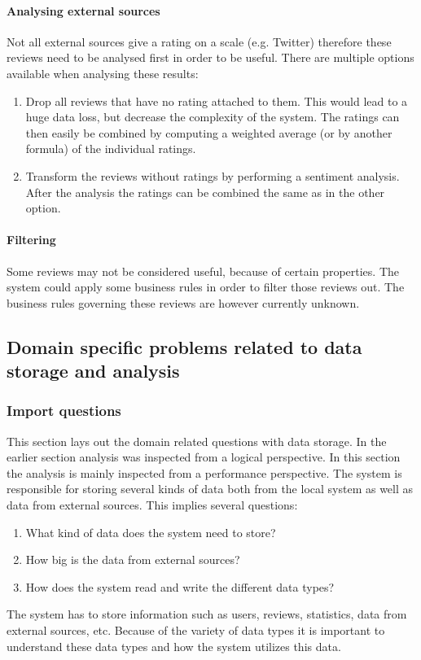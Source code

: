\paragraph{Analysing external sources}
Not all external sources give a rating on a scale (e.g. Twitter) therefore these reviews need to be analysed first in order to be useful. There are multiple options available when analysing these results:
\begin{enumerate}
\item Drop all reviews that have no rating attached to them. This would lead to a huge data loss, but decrease the complexity of the system. The ratings can then easily be combined by computing a weighted average (or by another formula) of the individual ratings.
\item Transform the reviews without ratings by performing a sentiment analysis. After the analysis the ratings can be combined the same as in the other option.
\end{enumerate}

\paragraph{Filtering}
Some reviews may not be considered useful, because of certain properties. The system could apply some business rules in order to filter those reviews out. The business rules governing these reviews are however currently unknown. 




\subsection{Domain specific problems related to data storage and analysis}
\subsubsection{Import questions}
This section lays out the domain related questions with data storage. In the earlier section analysis was inspected from a logical perspective. In this section the analysis is mainly inspected from a performance perspective. 
The system is responsible for storing several kinds of data both from the local system as well as data from external sources. This implies several questions:
\begin{enumerate}
\item What kind of data does the system need to store?
\item How big is the data from external sources?
\item How does the system read and write the different data types?
\end{enumerate}
The system has to store information such as users, reviews, statistics, data from external sources, etc. Because of the variety of data types it is important to understand these data types and how the system utilizes this data.


